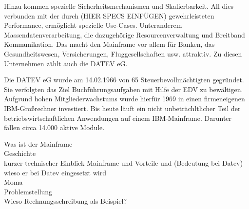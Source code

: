 Hinzu kommen spezielle Sicherheitsmechanismen und Skalierbarkeit.
All dies verbunden mit der durch (HIER SPECS EINFÜGEN) gewehrleisteten Performance, ermöglicht spezielle Use-Cases.
Unteranderem Massendatenverarbeitung, die dazugehörige Resourcenverwaltung und Breitband Kommunikation.
Das macht den Mainframe vor allem für Banken, das Gesundheitswesen, Versicherungen, Fluggesellschaften usw. attraktiv.
Zu diesen Unternehmen zählt auch die DATEV eG.
\cite{IBM.2014}

Die DATEV eG wurde am 14.02.1966 von 65 Steuerbevollmächtigten gegründet.
Sie verfolgten das Ziel Buchführungsaufgaben mit Hilfe der EDV zu bewältigen.
Aufgrund hohen Mitgliederwachstums wurde hierfür 1969 in einen firmeneigenen IBM-Großrechner investiert.\cite{DATEVeG.2017}
Bis heute läuft ein nicht unbeträchltlicher Teil der betriebswirtschaftlichen Anwendungen auf einem IBM-Mainframe.
Darunter fallen circa 14.000 aktive Module.


Was ist der Mainframe\\
Geschichte\\
kurzer technischer Einblick Mainframe und Vorteile und (Bedeutung bei Datev) \\
wieso er bei Datev eingesetzt wird \\
 Moma \\
 Problemstellung \\
 Wieso Rechnungsschreibung als Beispiel? \\